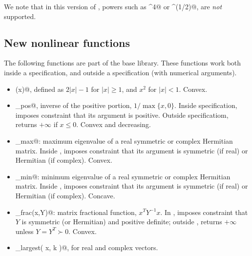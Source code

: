 \documentclass[12pt]{article}
\begin{document}
We note that in this version of \cvx, powers such as \verb@x^4@
or \verb@x^(1/2)@, are \emph{not} supported.

\subsection{New nonlinear functions}

The following functions are part of the base \cvx library.
These functions work both inside a \cvx specification,
and outside a \cvx specification (with numerical arguments).
\begin{itemize}
\item \verb@huber(x)@, defined as $2|x|-1$ for $|x|\geq 1$,
and $x^2$ for $|x|<1$.  Convex.
\item \verb@inv_pos@, inverse of the positive portion, $1/\max\{x,0\}$.
Inside \cvx specification,
imposes constraint that its argument is positive.
Outside \cvx specificatiom, returns $+\infty$ if $x\leq 0$.
Convex and decreasing.
\item \verb@lambda_max@: maximum eigenvalue of a real symmetric 
or complex Hermitian matrix.
Inside \cvx, imposes constraint that its argument 
is symmetric (if real) or Hermitian (if complex).
Convex.
\item \verb@lambda_min@: minimum eigenvalue of a real symmetric 
or complex Hermitian matrix.
Inside \cvx, imposes constraint that its argument 
is symmetric (if real) or Hermitian (if complex).
Concave.
\item \verb@matrix_frac(x,Y)@: matrix fractional function,
$x^TY^{-1}x$.  In \cvx, imposes constraint that $Y$ is 
symmetric (or Hermitian) and positive definite; outside \cvx,
returns $+\infty$ unless $Y=Y^T\succ 0$.
Convex.  
\item \verb@norm_largest( x, k )@, for real and complex vectors.

\end{itemize}
\end{document}
